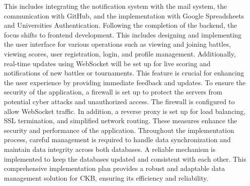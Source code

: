 This includes integrating the notification system with the mail system, the communication with GitHub, and the implementation with Google Spreadsheets and Universities 
Authentication.\newline
Following the completion of the backend, the focus shifts to frontend development. 
This includes designing and implementing the user interface for various operations such as viewing and joining battles, 
viewing scores, user registration, login, and profile management. 
Additionally, real-time updates using WebSocket will be set up for live scoring and notifications of new battles or tournaments. 
This feature is crucial for enhancing the user experience by providing immediate feedback and updates.\newline
To ensure the security of the application, a firewall is set up to protect the servers from potential cyber attacks and unauthorized access. 
The firewall is configured to allow WebSocket traffic. In addition, a reverse proxy is set up for load balancing, SSL termination, and simplified network routing. 
These measures enhance the security and performance of the application.\newline
Throughout the implementation process, careful management is required to handle data synchronization and maintain data integrity across both databases. 
A reliable mechanism is implemented to keep the databases updated and consistent with each other. 
This comprehensive implementation plan provides a robust and adaptable data management solution for CKB, ensuring its efficiency and reliability.

